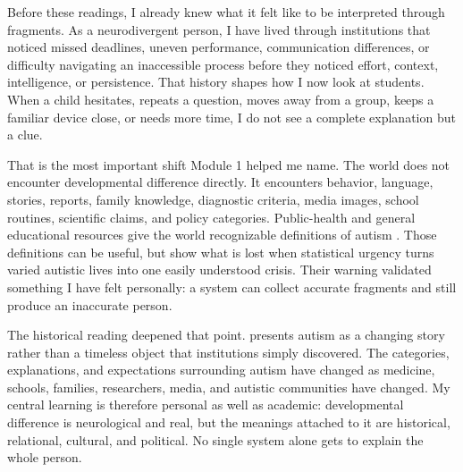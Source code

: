 
Before these readings, I already knew what it felt like to be interpreted through fragments. As a neurodivergent person, I have lived through institutions that noticed missed deadlines, uneven performance, communication differences, or difficulty navigating an inaccessible process before they noticed effort, context, intelligence, or persistence. That history shapes how I now look at students. When a child hesitates, repeats a question, moves away from a group, keeps a familiar device close, or needs more time, I do not see a complete explanation but a clue.

That is the most important shift Module 1 helped me name. The world does not encounter developmental difference directly. It encounters behavior, language, stories, reports, family knowledge, diagnostic criteria, media images, school routines, scientific claims, and policy categories. Public-health and general educational resources give the world recognizable definitions of autism \citep{cdcASD,simon2016asd,readingRocketsASD}. Those definitions can be useful, but \citet{orsiniDavidson2013critical} show what is lost when statistical urgency turns varied autistic lives into one easily understood crisis. Their warning validated something I have felt personally: a system can collect accurate fragments and still produce an inaccurate person.

The historical reading deepened that point. \citet{harvey2018story} presents autism as a changing story rather than a timeless object that institutions simply discovered. The categories, explanations, and expectations surrounding autism have changed as medicine, schools, families, researchers, media, and autistic communities have changed. My central learning is therefore personal as well as academic: developmental difference is neurological and real, but the meanings attached to it are historical, relational, cultural, and political. No single system alone gets to explain the whole person.
